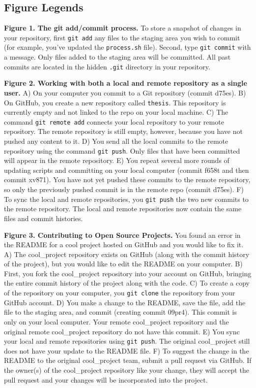 \subsection{Figure Legends}

\textbf{Figure 1. The git add/commit process.}
To store a snapshot of changes in your repository, first \verb|git add| any files to the staging area you wish to commit (for example, you've updated the \verb|process.sh| file).
Second, type \verb|git commit| with a message. Only files added to the staging area will be committed.
All past commits are located in the hidden \verb|.git| directory in your repository.

\textbf{Figure 2. Working with both a local and remote repository as a single user.}
A) On your computer you commit to a Git repository (commit d75es).
B) On GitHub, you create a new repository called \verb|thesis|.
This repository is currently empty and not linked to the repo on your local machine.
C) The command \verb|git remote add| connects your local repository to your remote repository.
The remote repository is still empty, however, because you have not pushed any content to it.
D) You send all the local commits to the remote repository using the command \verb|git push|.
Only files that have been committed will appear in the remote repository.
E) You repeat several more rounds of updating scripts and committing on your local computer (commit f658t and then commit xv871).
You have not yet pushed these commits to the remote repository, so only the previously pushed commit is in the remote repo (commit d75es).
F) To sync the local and remote repositories, you \verb|git push| the two new commits to the remote repository.
The local and remote repositories now contain the same files and commit histories.

\textbf{Figure 3. Contributing to Open Source Projects.}
You found an error in the README for a cool project hosted on GitHub and you would like to fix it.
A) The cool\_project repository exists on GitHub (along with the commit history of the project), but you would like to edit the README on your computer.
B) First, you fork the cool\_project repository into your account on GitHub, bringing the entire commit history of the project along with the code.
C) To create a copy of the repository on your computer, you \verb|git clone| the repository from your GitHub account.
D) You make a change to the README, save the file, add the file to the staging area, and commit (creating commit 09pr4).
This commit is only on your local computer.
Your remote cool\_project repository and the original remote cool\_project repository do not have this commit.
E) You sync your local and remote repositories using \verb|git push|.
The original cool\_project still does not have your update to the README file.
F) To suggest the change in the README to the original cool\_project team, submit a pull request via GitHub.
If the owner(s) of the cool\_project repository like your change, they will accept the pull request and your changes will be incorporated into the project.

